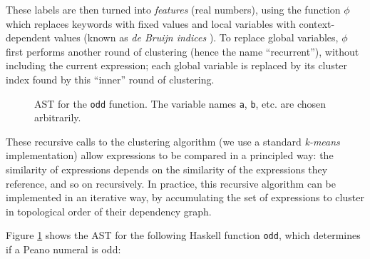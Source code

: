 \documentclass[]{default}
\newcommand{\id}[1]{\texttt{"#1"}}
\newcommand{\CVar}{\texttt{Var}}
\newcommand{\CApp}{\texttt{App}}
\newcommand{\CLam}{\texttt{Lam}}
\newcommand{\CCase}{\texttt{Case}}
\newcommand{\CLocal}{\texttt{Local}}
\newcommand{\CGlobal}{\texttt{Global}}
\newcommand{\CConstructor}{\texttt{Constructor}}
\newcommand{\CAlt}{\texttt{Alt}}
\newcommand{\CDataAlt}{\texttt{DataAlt}}
\begin{document}
These labels are then turned into \emph{features} (real numbers), using the function $\phi$ which replaces keywords with fixed values and local variables with context-dependent values (known as \emph{de Bruijn indices} \cite{de1972lambda}). To replace global variables, $\phi$ first performs another round of clustering (hence the name
``recurrent''), without including the current expression; each global
variable is replaced by its cluster index found by this ``inner'' round
of clustering.

\begin{figure}
    \begin{small}
    \end{small}
    \caption{AST for the \texttt{odd} function. The variable names \texttt{a}, \texttt{b}, etc. are chosen arbitrarily.}
    \label{fig:astexample}
\end{figure}

These recursive calls to the clustering algorithm (we use a standard
\emph{k-means} implementation) allow expressions to be compared in a
principled way: the similarity of expressions depends on the similarity of the expressions they reference, and so on recursively. In practice, this recursive
algorithm can be implemented in an iterative way, by accumulating the set of expressions to cluster in topological order of their dependency graph.

Figure \ref{fig:astexample} shows the AST for the following Haskell function \texttt{odd}, which determines if a Peano numeral is odd:
\end{document}
